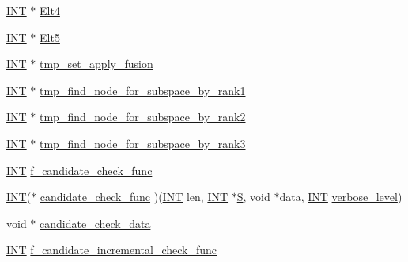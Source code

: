 \begin{DoxyCompactItemize}
\mbox{\hyperlink{galois_8h_a09fddde158a3a20bd2dcadb609de11dc}{I\+NT}} $\ast$ \mbox{\hyperlink{classgenerator_a065b0b47eb41c9bd25ce53f3d597d463}{Elt4}}
\item 
\mbox{\hyperlink{galois_8h_a09fddde158a3a20bd2dcadb609de11dc}{I\+NT}} $\ast$ \mbox{\hyperlink{classgenerator_a332bd847a565e209febc3a4aa1296eae}{Elt5}}
\item 
\mbox{\hyperlink{galois_8h_a09fddde158a3a20bd2dcadb609de11dc}{I\+NT}} $\ast$ \mbox{\hyperlink{classgenerator_af3afbbbe276537b44abdd6b88839479a}{tmp\+\_\+set\+\_\+apply\+\_\+fusion}}
\item 
\mbox{\hyperlink{galois_8h_a09fddde158a3a20bd2dcadb609de11dc}{I\+NT}} $\ast$ \mbox{\hyperlink{classgenerator_aae9bc1b1bb185d888ddca352e9dc1708}{tmp\+\_\+find\+\_\+node\+\_\+for\+\_\+subspace\+\_\+by\+\_\+rank1}}
\item 
\mbox{\hyperlink{galois_8h_a09fddde158a3a20bd2dcadb609de11dc}{I\+NT}} $\ast$ \mbox{\hyperlink{classgenerator_a2e2af720384abd883d05cd284a0a672b}{tmp\+\_\+find\+\_\+node\+\_\+for\+\_\+subspace\+\_\+by\+\_\+rank2}}
\item 
\mbox{\hyperlink{galois_8h_a09fddde158a3a20bd2dcadb609de11dc}{I\+NT}} $\ast$ \mbox{\hyperlink{classgenerator_a0c9da7f1ce2c9c0c5bb6fc6dc8654d09}{tmp\+\_\+find\+\_\+node\+\_\+for\+\_\+subspace\+\_\+by\+\_\+rank3}}
\item 
\mbox{\hyperlink{galois_8h_a09fddde158a3a20bd2dcadb609de11dc}{I\+NT}} \mbox{\hyperlink{classgenerator_addce6c1339ebc779e72601e44ebb48f8}{f\+\_\+candidate\+\_\+check\+\_\+func}}
\item 
\mbox{\hyperlink{galois_8h_a09fddde158a3a20bd2dcadb609de11dc}{I\+NT}}($\ast$ \mbox{\hyperlink{classgenerator_aa8921157f7660063029ac65461806e9c}{candidate\+\_\+check\+\_\+func}} )(\mbox{\hyperlink{galois_8h_a09fddde158a3a20bd2dcadb609de11dc}{I\+NT}} len, \mbox{\hyperlink{galois_8h_a09fddde158a3a20bd2dcadb609de11dc}{I\+NT}} $\ast$\mbox{\hyperlink{classgenerator_a5d2b65e2bd0e451744af1a47ba00bd96}{S}}, void $\ast$data, \mbox{\hyperlink{galois_8h_a09fddde158a3a20bd2dcadb609de11dc}{I\+NT}} \mbox{\hyperlink{classgenerator_a7fedc6488314cbc00dbfcc42d311e1ce}{verbose\+\_\+level}})
\item 
void $\ast$ \mbox{\hyperlink{classgenerator_ad5e5c1ae6a19af6869d590c328493a87}{candidate\+\_\+check\+\_\+data}}
\item 
\mbox{\hyperlink{galois_8h_a09fddde158a3a20bd2dcadb609de11dc}{I\+NT}} \mbox{\hyperlink{classgenerator_a2e93821e89e1ec98f2c55786ddc18180}{f\+\_\+candidate\+\_\+incremental\+\_\+check\+\_\+func}}

\end{DoxyCompactItemize}
